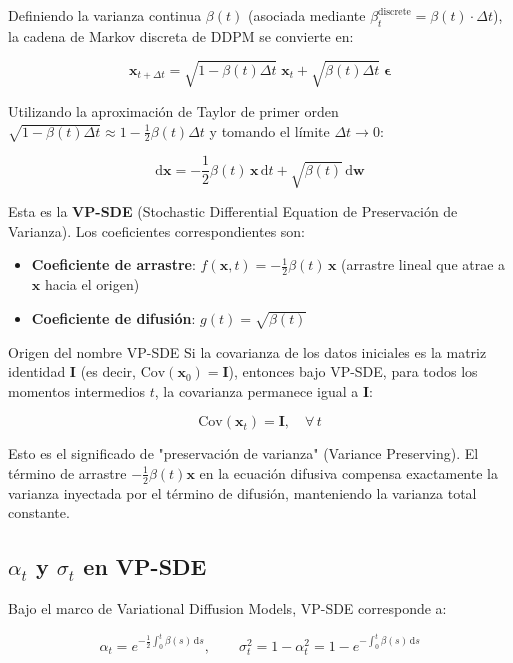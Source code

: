 \documentclass[a4paper]{article}
\begin{document}
Definiendo la varianza continua $\beta(t)$ (asociada mediante $\beta_t^{\text{discrete}} = \beta(t) \cdot \Delta t$), la cadena de Markov discreta de DDPM se convierte en:

$$
\mathbf{x}_{t+\Delta t} = \sqrt{1 - \beta(t)\Delta t}\;\mathbf{x}_t + \sqrt{\beta(t)\Delta t}\;\boldsymbol{\epsilon}
$$

Utilizando la aproximación de Taylor de primer orden $\sqrt{1 - \beta(t)\Delta t} \approx 1 - \frac{1}{2}\beta(t)\Delta t$ y tomando el límite $\Delta t \to 0$:

$$
\mathrm{d}\mathbf{x} = -\frac{1}{2}\beta(t)\,\mathbf{x}\,\mathrm{d}t + \sqrt{\beta(t)}\,\mathrm{d}\mathbf{w}
$$

Esta es la \textbf{VP-SDE} (Stochastic Differential Equation de Preservación de Varianza). Los coeficientes correspondientes son:

\begin{itemize}
    \item \textbf{Coeficiente de arrastre}: $f(\mathbf{x}, t) = -\frac{1}{2}\beta(t)\,\mathbf{x}$ (arrastre lineal que atrae a $\mathbf{x}$ hacia el origen)
    \item \textbf{Coeficiente de difusión}: $g(t) = \sqrt{\beta(t)}$
\end{itemize}

\begin{importantbox}{Origen del nombre VP-SDE}
Si la covarianza de los datos iniciales es la matriz identidad $\mathbf{I}$ (es decir, $\mathrm{Cov}(\mathbf{x}_0) = \mathbf{I}$), entonces bajo VP-SDE, para todos los momentos intermedios $t$, la covarianza permanece igual a $\mathbf{I}$:

$$
\mathrm{Cov}(\mathbf{x}_t) = \mathbf{I}, \quad \forall\, t
$$

Esto es el significado de "preservación de varianza" (Variance Preserving). El término de arrastre $-\frac{1}{2}\beta(t)\mathbf{x}$ en la ecuación difusiva compensa exactamente la varianza inyectada por el término de difusión, manteniendo la varianza total constante.
\end{importantbox}

\subsection{$\alpha_t$ y $\sigma_t$ en VP-SDE}

Bajo el marco de Variational Diffusion Models, VP-SDE corresponde a:

$$
\alpha_t = e^{-\frac{1}{2}\int_0^t \beta(s)\,\mathrm{d}s}, \qquad \sigma_t^2 = 1 - \alpha_t^2 = 1 - e^{-\int_0^t \beta(s)\,\mathrm{d}s}
$$
\end{document}
